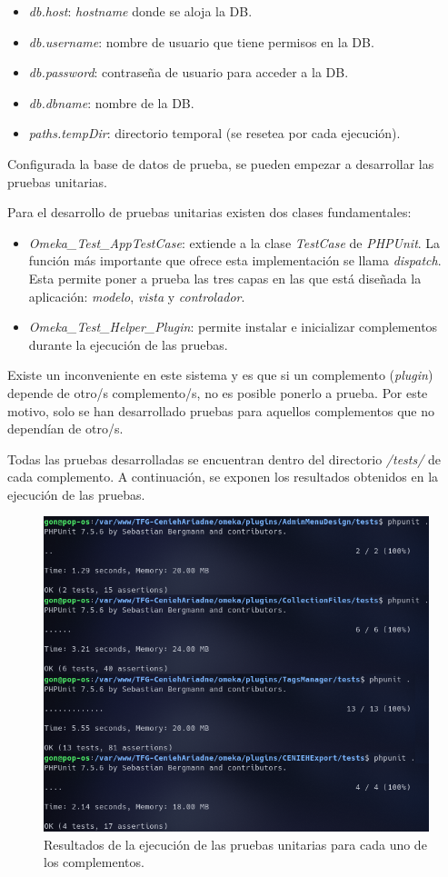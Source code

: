 \documentclass[
]{article}
\providecommand{\tightlist}{%
  \setlength{\itemsep}{0pt}\setlength{\parskip}{0pt}}
\begin{document}
\begin{itemize}
\tightlist
\item
  \emph{db.host}: \emph{hostname} donde se aloja la DB.
\item
  \emph{db.username}: nombre de usuario que tiene permisos en la DB.
\item
  \emph{db.password}: contraseña de usuario para acceder a la DB.
\item
  \emph{db.dbname}: nombre de la DB.
\item
  \emph{paths.tempDir}: directorio temporal (se resetea por cada
  ejecución).
\end{itemize}

Configurada la base de datos de prueba, se pueden empezar a desarrollar
las pruebas unitarias.

Para el desarrollo de pruebas unitarias existen dos clases
fundamentales:

\begin{itemize}
\tightlist
\item
  \emph{Omeka\_Test\_AppTestCase}: extiende a la clase \emph{TestCase}
  de \emph{PHPUnit}. La función más importante que ofrece esta
  implementación se llama \emph{dispatch}. Esta permite poner a prueba
  las tres capas en las que está diseñada la aplicación: \emph{modelo},
  \emph{vista} y \emph{controlador}.
\item
  \emph{Omeka\_Test\_Helper\_Plugin}: permite instalar e inicializar
  complementos durante la ejecución de las pruebas.
\end{itemize}

Existe un inconveniente en este sistema y es que si un complemento
(\emph{plugin}) depende de otro/s complemento/s, no es posible ponerlo a
prueba. Por este motivo, solo se han desarrollado pruebas para aquellos
complementos que no dependían de otro/s.

Todas las pruebas desarrolladas se encuentran dentro del directorio
\emph{/tests/} de cada complemento. A continuación, se exponen los
resultados obtenidos en la ejecución de las pruebas.

\begin{figure}
\hypertarget{unittests}{%
\centering
\includegraphics{../_static/images/unittests.png}
\caption{Resultados de la ejecución de las pruebas unitarias para cada
uno de los complementos.}\label{unittests}
}
\end{figure}
\end{document}
